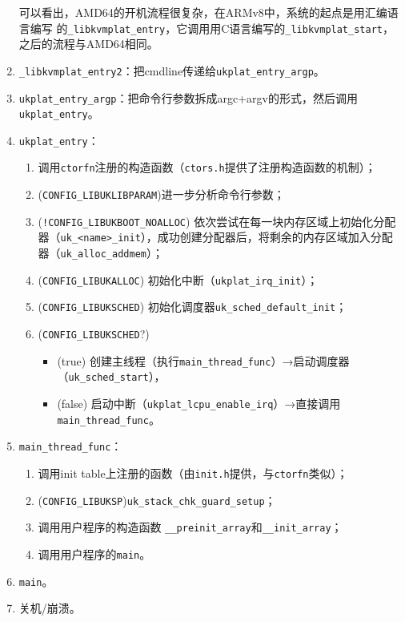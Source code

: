 \documentclass[UTF8,fontset=none,linespread=1.15]{ctexart}
\begin{document}
\begin{enumerate}
\begin{enumerate}
    \end{enumerate}
    可以看出，AMD64的开机流程很复杂，在ARMv8中，系统的起点是用汇编语言编写
    的\texttt{\_libkvmplat\_entry}，它调用用C语言编写的\texttt{\_libkvmplat\_start}，
    之后的流程与AMD64相同。
\item \texttt{\_libkvmplat\_entry2}：把cmdline传递给\texttt{ukplat\_entry\_argp}。
\item \texttt{ukplat\_entry\_argp}：把命令行参数拆成argc+argv的形式，然后调用\texttt{ukplat\_entry}。
\item \texttt{ukplat\_entry}：
    \begin{enumerate}
    \item 调用\texttt{ctorfn}注册的构造函数（\texttt{ctors.h}提供了注册构造函数的机制）；
    \item (\texttt{CONFIG\_LIBUKLIBPARAM})进一步分析命令行参数；
    \item (\texttt{!CONFIG\_LIBUKBOOT\_NOALLOC}) 依次尝试在每一块内存区域上初始化分配器\linebreak（\texttt{uk\_<name>\_init}），成功创建分配器后，将剩余的内存区域加入分配器\linebreak（\texttt{uk\_alloc\_addmem}）；
    \item (\texttt{CONFIG\_LIBUKALLOC}) 初始化中断（\texttt{ukplat\_irq\_init}）；
    \item (\texttt{CONFIG\_LIBUKSCHED}) 初始化调度器\texttt{uk\_sched\_default\_init}；
    \item (\texttt{CONFIG\_LIBUKSCHED}?)
        \begin{itemize}
        \item (true)  创建主线程（执行\texttt{main\_thread\_func}）→启动调度器（\texttt{uk\_sched\_start}），
        \item (false) 启动中断（\texttt{ukplat\_lcpu\_enable\_irq}）→直接调用\texttt{main\_thread\_func}。
        \end{itemize}
    \end{enumerate}
\item \texttt{main\_thread\_func}：
    \begin{enumerate}
    \item 调用init table上注册的函数（由\texttt{init.h}提供，与\texttt{ctorfn}类似）；
    \item (\texttt{CONFIG\_LIBUKSP})\texttt{uk\_stack\_chk\_guard\_setup}；
    \item 调用用户程序的构造函数 \texttt{\_\_preinit\_array}和\texttt{\_\_init\_array}；
    \item 调用用户程序的\texttt{main}。
    \end{enumerate}
\item \texttt{main}。
\item 关机/崩溃。
\end{enumerate}
\end{document}
